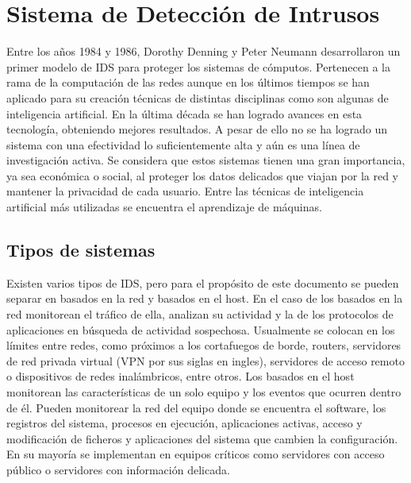 \chapter{Sistema de Detección de Intrusos}\label{chapter:ids}

Entre los años 1984 y 1986, Dorothy Denning y Peter Neumann desarrollaron un primer modelo de IDS \cite{denning1985requirements} para proteger los sistemas de cómputos. Pertenecen a la rama de la computación de las redes aunque en los últimos tiempos se han aplicado para su creación técnicas de distintas disciplinas como son algunas de inteligencia artificial. En la última década se han logrado avances en esta tecnología, obteniendo mejores resultados. A pesar de ello no se ha logrado un sistema con una efectividad lo suficientemente alta y aún es una línea de investigación activa. Se considera que estos sistemas tienen una gran importancia, ya sea económica o social, al proteger los datos delicados que viajan por la red y mantener la privacidad de cada usuario. Entre las técnicas de inteligencia artificial más utilizadas se encuentra el aprendizaje de máquinas.

\section{Tipos de sistemas}
Existen varios tipos de IDS, pero para el propósito de este documento se pueden separar en basados en la red y basados en el host. En el caso de los basados en la red monitorean el tráfico de ella, analizan su actividad y la de los protocolos de aplicaciones en búsqueda de actividad sospechosa. Usualmente se colocan en los límites entre redes, como próximos a los cortafuegos de borde, routers, servidores de red privada virtual (VPN por sus siglas en ingles), servidores de acceso remoto o dispositivos de redes inalámbricos, entre otros. Los basados en el host monitorean las características de un solo equipo y los eventos que ocurren dentro de él. Pueden monitorear la red del equipo donde se encuentra el software, los registros del sistema, procesos en ejecución, aplicaciones activas, acceso y modificación de ficheros y aplicaciones del sistema que cambien la configuración. En su mayoría se implementan en equipos críticos como servidores con acceso público o servidores con información delicada.

